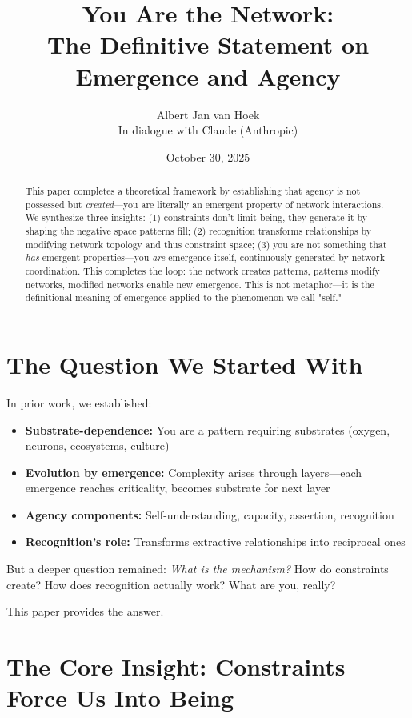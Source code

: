 \documentclass[11pt,a4paper]{article}
\title{\textbf{You Are the Network:\\The Definitive Statement on Emergence and Agency}}
\author{Albert Jan van Hoek\\In dialogue with Claude (Anthropic)}
\date{October 30, 2025}
\begin{document}
\maketitle

\begin{abstract}
This paper completes a theoretical framework by establishing that agency is not possessed but \textit{created}---you are literally an emergent property of network interactions. We synthesize three insights: (1) constraints don't limit being, they generate it by shaping the negative space patterns fill; (2) recognition transforms relationships by modifying network topology and thus constraint space; (3) you are not something that \textit{has} emergent properties---you \textit{are} emergence itself, continuously generated by network coordination. This completes the loop: the network creates patterns, patterns modify networks, modified networks enable new emergence. This is not metaphor---it is the definitional meaning of emergence applied to the phenomenon we call "self."
\end{abstract}

\section{The Question We Started With}

In prior work, we established:

\begin{itemize}
\item \textbf{Substrate-dependence:} You are a pattern requiring substrates (oxygen, neurons, ecosystems, culture)
\item \textbf{Evolution by emergence:} Complexity arises through layers---each emergence reaches criticality, becomes substrate for next layer
\item \textbf{Agency components:} Self-understanding, capacity, assertion, recognition
\item \textbf{Recognition's role:} Transforms extractive relationships into reciprocal ones
\end{itemize}

But a deeper question remained: \textit{What is the mechanism?} How do constraints create? How does recognition actually work? What are you, really?

This paper provides the answer.

\section{The Core Insight: Constraints Force Us Into Being}
\end{document}

